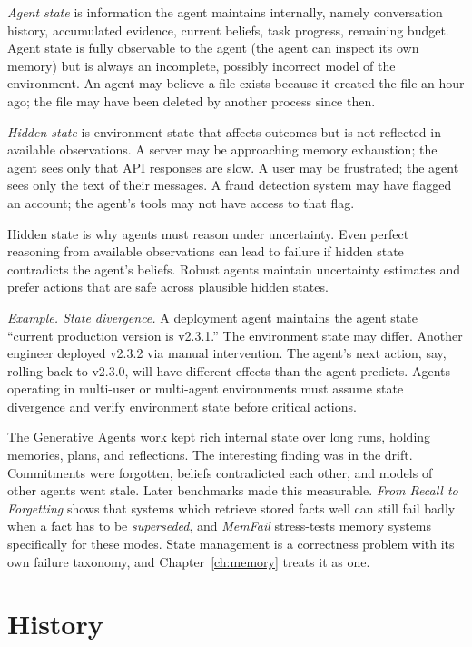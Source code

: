 \textit{Agent state} is information the agent maintains internally, namely conversation history, accumulated evidence, current beliefs, task progress, remaining budget. Agent state is fully observable to the agent (the agent can inspect its own memory) but is always an incomplete, possibly incorrect model of the environment. An agent may believe a file exists because it created the file an hour ago; the file may have been deleted by another process since then.

\textit{Hidden state} is environment state that affects outcomes but is not reflected in available observations. A server may be approaching memory exhaustion; the agent sees only that API responses are slow. A user may be frustrated; the agent sees only the text of their messages. A fraud detection system may have flagged an account; the agent's tools may not have access to that flag.

Hidden state is why agents must reason under uncertainty. Even perfect reasoning from available observations can lead to failure if hidden state contradicts the agent's beliefs. Robust agents maintain uncertainty estimates and prefer actions that are safe across plausible hidden states.

\textit{Example. State divergence.} A deployment agent maintains the agent state ``current production version is v2.3.1.'' The environment state may differ. Another engineer deployed v2.3.2 via manual intervention. The agent's next action, say, rolling back to v2.3.0, will have different effects than the agent predicts. Agents operating in multi-user or multi-agent environments must assume state divergence and verify environment state before critical actions.

The Generative Agents work \cite{park2023generative} kept rich internal state over long runs, holding memories, plans, and reflections. The interesting finding was in the drift. Commitments were forgotten, beliefs contradicted each other, and models of other agents went stale. Later benchmarks made this measurable. \emph{From Recall to Forgetting} \cite{recallforget2026} shows that systems which retrieve stored facts well can still fail badly when a fact has to be \emph{superseded}, and \emph{MemFail} \cite{memfail2026} stress-tests memory systems specifically for these modes. State management is a correctness problem with its own failure taxonomy, and Chapter~\ref{ch:memory} treats it as one.

\section{History}

